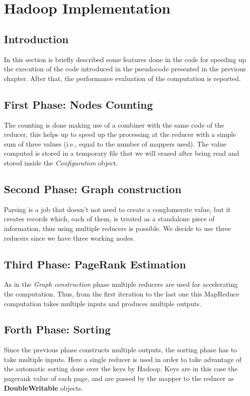 \section{Hadoop Implementation}
\subsection{Introduction}
In this section is briefly described some features done in the code for speeding up the execution of the code introduced in the pseudocode presented in the previous chapter. After that, the performance evaluation of the computation is reported.


\subsection{First Phase: Nodes Counting}
The counting is done making use of a combiner with the same code of the reducer, this helps up to speed up the processing at the reducer with a simple sum of three values (i.e., equal to the number of mappers used). The value computed is stored in a temporary file that we will erased after being read and stored inside the \textit{Configuration} object.

\subsection{Second Phase: Graph construction}
Parsing is a job that doesn't not need to create a conglomerate value, but it creates records which, each of them, is treated as a standalone piece of information, thus using multiple reducers is possible. We decide to use three reducers since we have three working nodes.

\subsection{Third Phase: PageRank Estimation}
As in the \textit{Graph construction} phase multiple reducers are used for accelerating the computation. Thus, from the first iteration to the last one this MapReduce computation takes multiple inputs and produces multiple outputs.

\subsection{Forth Phase: Sorting}
Since the previous phase constructs multiple outputs, the sorting phase has to take multiple inputs. Here a single reducer is used in order to take advantage of the automatic sorting done over the keys by Hadoop. Keys are in this case the pagerank value of each page, and are passed by the mapper to the reducer as \textbf{DoubleWritable} objects.

